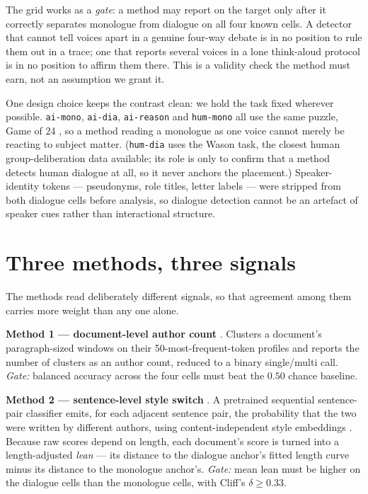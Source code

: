 \documentclass[10pt,twocolumn]{article}
\begin{document}
The grid works as a \emph{gate}: a method may report on the target only after it correctly
separates monologue from dialogue on all four known cells. A detector that cannot tell voices apart
in a genuine four-way debate is in no position to rule them out in a trace; one that reports several
voices in a lone think-aloud protocol is in no position to affirm them there. This is a validity
check the method must earn, not an assumption we grant it.

One design choice keeps the contrast clean: we hold the task fixed wherever possible.
\texttt{ai-mono}, \texttt{ai-dia}, \texttt{ai-reason} and \texttt{hum-mono} all use the same puzzle,
Game of 24 \cite{yao2023}, so a method reading a monologue as one voice cannot merely be reacting
to subject matter. (\texttt{hum-dia} uses the Wason task, the closest human group-deliberation data
available; its role is only to confirm that a method detects human dialogue at all, so it never
anchors the placement.) Speaker-identity tokens --- pseudonyms, role titles, letter labels --- were
stripped from both dialogue cells before analysis, so dialogue detection cannot be an artefact of
speaker cues rather than interactional structure.

\section{Three methods, three signals}
The methods read deliberately different signals, so that agreement among them carries more weight
than any one alone.

\textbf{Method 1 --- document-level author count} \cite{nath2019}. Clusters a document's
paragraph-sized windows on their 50-most-frequent-token profiles and reports the number of
clusters as an author count, reduced to a binary single/multi call. \emph{Gate:} balanced accuracy
across the four cells must beat the $0.50$ chance baseline.

\textbf{Method 2 --- sentence-level style switch} \cite{schmidt2025}. A pretrained sequential
sentence-pair classifier emits, for each adjacent sentence pair, the probability that the two were
written by different authors, using content-independent style embeddings \cite{patel2025}. Because
raw scores depend on length, each document's score is turned into a length-adjusted \emph{lean}
--- its distance to the dialogue anchor's fitted length curve minus its distance to the monologue
anchor's. \emph{Gate:} mean lean must be higher on the dialogue cells than the monologue cells,
with Cliff's $\delta\ge0.33$.
\end{document}

